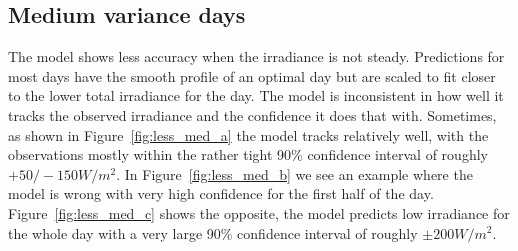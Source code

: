 \subsection{Medium variance days}
The model shows less accuracy when the irradiance is not steady. Predictions for most days have the smooth profile of an optimal day but are scaled to fit closer to the lower total irradiance for the day. The model is inconsistent in how well it tracks the observed irradiance and the confidence it does that with. Sometimes, as shown in Figure~\ref{fig:less_med_a} the model tracks relatively well, with the observations mostly within the rather tight 90\% confidence interval of roughly $+50/-150 W/m^2$. In Figure~\ref{fig:less_med_b} we see an example where the model is wrong with very high confidence for the first half of the day. Figure~\ref{fig:less_med_c} shows the opposite, the model predicts low irradiance for the whole day with a very large 90\% confidence interval of roughly $\pm200 W/m^2$.

